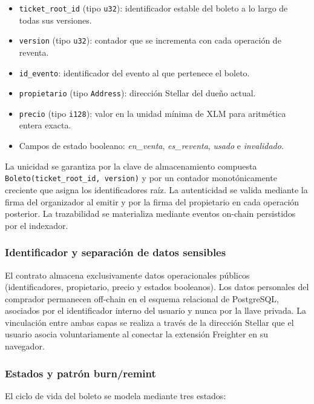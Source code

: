 \begin{itemize}\setlength{\itemsep}{2pt}
    \item \texttt{ticket\_root\_id} (tipo \texttt{u32}): identificador estable del boleto a lo largo de todas
sus versiones.
    \item \texttt{version} (tipo \texttt{u32}): contador que se incrementa con cada operación de reventa.
    \item \texttt{id\_evento}: identificador del evento al que pertenece el boleto.
    \item \texttt{propietario} (tipo \texttt{Address}): dirección Stellar del dueño actual.
    \item \texttt{precio} (tipo \texttt{i128}): valor en la unidad mínima de XLM para aritmética entera
exacta.
    \item Campos de estado booleano: \textit{en\_venta}, \textit{es\_reventa}, \textit{usado} e
\textit{invalidado}.
\end{itemize}

La unicidad se garantiza por la clave de almacenamiento compuesta \texttt{Boleto(ticket\_root\_id, version)}
y por un contador monotónicamente creciente que asigna los identificadores raíz. La autenticidad se valida
mediante la firma del organizador al emitir y por la firma del propietario en cada operación posterior. La
trazabilidad se materializa mediante eventos on-chain persistidos por el indexador.

\subsubsection{Identificador y separación de datos sensibles}

El contrato almacena exclusivamente datos operacionales públicos (identificadores, propietario, precio y
estados booleanos). Los datos personales del comprador permanecen off-chain en el esquema relacional de
PostgreSQL, asociados por el identificador interno del usuario y nunca por la llave privada. La vinculación
entre ambas capas se realiza a través de la dirección Stellar que el usuario asocia voluntariamente al
conectar la extensión Freighter en su navegador.

\subsubsection{Estados y patrón burn/remint}

El ciclo de vida del boleto se modela mediante tres estados:

